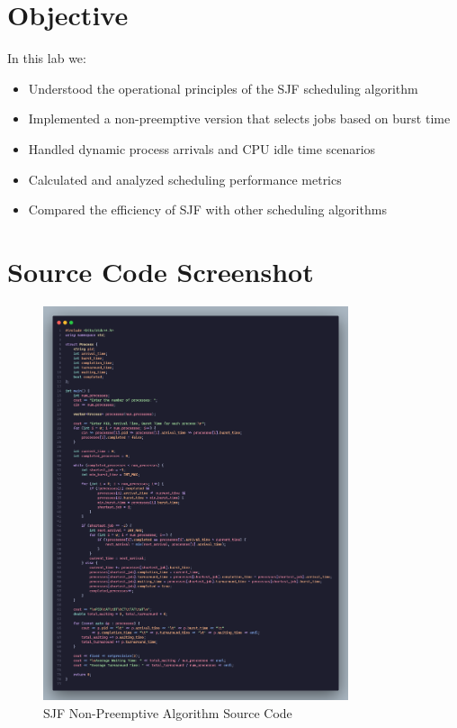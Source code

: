 \documentclass[12pt,a4paper]{article}
\begin{document}
\section{Objective}
In this lab we:
\begin{itemize}
    \item Understood the operational principles of the SJF scheduling algorithm
    \item Implemented a non-preemptive version that selects jobs based on burst time
    \item Handled dynamic process arrivals and CPU idle time scenarios
    \item Calculated and analyzed scheduling performance metrics
    \item Compared the efficiency of SJF with other scheduling algorithms
\end{itemize}

\section{Source Code Screenshot}
\begin{figure}[H]
    \centering
    \includegraphics[width=0.8\textwidth]{code.png}
    \caption{SJF Non-Preemptive Algorithm Source Code}
    \label{fig:sjf_source}
\end{figure}
\end{document}
